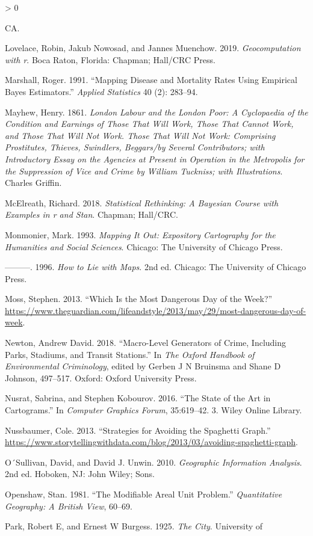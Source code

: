\documentclass[
]{book}
\newlength{\cslhangindent}
\newenvironment{CSLReferences}[2] %
 {%
  \setlength{\parindent}{0pt}
  \ifodd #1 \everypar{\setlength{\hangindent}{\cslhangindent}}\ignorespaces\fi
  \ifnum #2 > 0
  \setlength{\parskip}{#2\baselineskip}
  \fi
 }%
 {}
\begin{document}
\begin{CSLReferences}{1}{0}
CA.

\leavevmode\hypertarget{ref-Lovelace_2019}{}%
Lovelace, Robin, Jakub Nowosad, and Jannes Muenchow. 2019. \emph{Geocomputation with r}. Boca Raton, Florida: Chapman; Hall/CRC Press.

\leavevmode\hypertarget{ref-Marshall_1991}{}%
Marshall, Roger. 1991. {``Mapping Disease and Mortality Rates Using Empirical Bayes Estimators.''} \emph{Applied Statistics} 40 (2): 283--94.

\leavevmode\hypertarget{ref-Mayhew_1861}{}%
Mayhew, Henry. 1861. \emph{London Labour and the London Poor: A Cyclopaedia of the Condition and Earnings of Those That Will Work, Those That Cannot Work, and Those That Will Not Work. Those That Will Not Work: Comprising Prostitutes, Thieves, Swindlers, Beggars/by Several Contributors; with Introductory Essay on the Agencies at Present in Operation in the Metropolis for the Suppression of Vice and Crime by William Tuckniss; with Illustrations}. Charles Griffin.

\leavevmode\hypertarget{ref-McElreath_2018}{}%
McElreath, Richard. 2018. \emph{Statistical Rethinking: A Bayesian Course with Examples in r and Stan}. Chapman; Hall/CRC.

\leavevmode\hypertarget{ref-Monmonier_1993}{}%
Monmonier, Mark. 1993. \emph{Mapping It Out: Expository Cartography for the Humanities and Social Sciences}. Chicago: The University of Chicago Press.

\leavevmode\hypertarget{ref-Monmonier_1996}{}%
---------. 1996. \emph{How to Lie with Maps}. 2nd ed. Chicago: The University of Chicago Press.

\leavevmode\hypertarget{ref-Moss_2013}{}%
Moss, Stephen. 2013. {``Which Is the Most Dangerous Day of the Week?''} \url{https://www.theguardian.com/lifeandstyle/2013/may/29/most-dangerous-day-of-week}.

\leavevmode\hypertarget{ref-Newton_2018}{}%
Newton, Andrew David. 2018. {``Macro-Level Generators of Crime, Including Parks, Stadiums, and Transit Stations.''} In \emph{The Oxford Handbook of Environmental Criminology}, edited by Gerben J N Bruinsma and Shane D Johnson, 497--517. Oxford: Oxford University Press.

\leavevmode\hypertarget{ref-Nusrat_2016}{}%
Nusrat, Sabrina, and Stephen Kobourov. 2016. {``The State of the Art in Cartograms.''} In \emph{Computer Graphics Forum}, 35:619--42. 3. Wiley Online Library.

\leavevmode\hypertarget{ref-Nussbaumer_2013}{}%
Nussbaumer, Cole. 2013. {``Strategies for Avoiding the Spaghetti Graph.''} \url{https://www.storytellingwithdata.com/blog/2013/03/avoiding-spaghetti-graph}.

\leavevmode\hypertarget{ref-OSullivan_2010}{}%
O´Sullivan, David, and David J. Unwin. 2010. \emph{Geographic Information Analysis}. 2nd ed. Hoboken, NJ: John Wiley; Sons.

\leavevmode\hypertarget{ref-Openshaw_1981}{}%
Openshaw, Stan. 1981. {``The Modifiable Areal Unit Problem.''} \emph{Quantitative Geography: A British View}, 60--69.

\leavevmode\hypertarget{ref-Park_1925}{}%
Park, Robert E, and Ernest W Burgess. 1925. \emph{The City}. University of 
\end{CSLReferences}
\end{document}
